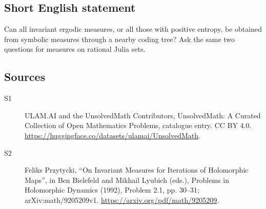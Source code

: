 \documentclass[11pt]{article}
\begin{document}
\subsection{Short English statement}
Can all invariant ergodic measures, or all those with positive entropy, be obtained from symbolic measures through a nearby coding tree? Ask the same two questions for measures on rational Julia sets.
\subsection{Sources}
\begin{description}
\item[\hypertarget{source:statement:1}{S1}] ULAM.AI and the UnsolvedMath Contributors, UnsolvedMath: A Curated Collection of Open Mathematics Problems, catalogue entry. CC BY 4.0. \url{https://huggingface.co/datasets/ulamai/UnsolvedMath}.
\item[\hypertarget{source:statement:2}{S2}] Feliks Przytycki, ``On Invariant Measures for Iterations of Holomorphic Maps'', in Ben Bielefeld and Mikhail Lyubich (eds.), Problems in Holomorphic Dynamics (1992), Problem 2.1, pp. 30--31; arXiv:math/9205209v1. \url{https://arxiv.org/pdf/math/9205209}.
\end{description}
\label{end:statement}
\end{document}
